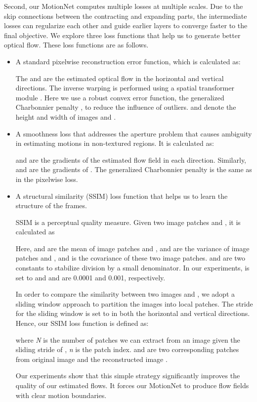 \documentclass[runningheads]{llncs}
\begin{document}
		Second, our MotionNet computes multiple losses at multiple scales. Due to the skip connections between the contracting and expanding parts, the intermediate losses can regularize each other and guide earlier layers to converge faster to the final objective. We explore three loss functions that help us to generate better optical flow. These loss functions are as follows. 
		\begin{itemize}
			\item A standard pixelwise reconstruction error function, which is calculated as:
			
			The  and  are the estimated optical flow in the horizontal and vertical directions. The inverse warping  is performed using a spatial transformer module \cite{stn_nips15}. Here we use a robust convex error function, the generalized Charbonnier penalty ,  to reduce the influence of outliers. {\color{black}  and  denote the height and width of images  and .}
			
			\item A smoothness loss that addresses the aperture problem that causes ambiguity in estimating motions in non-textured regions. It is calculated as:
			
			 and  are the gradients of the estimated flow field  in each direction. Similarly,   and  are the gradients of . The generalized Charbonnier penalty  is the same as in the pixelwise loss. 
			
			\item A structural similarity (SSIM) loss function{\color{black}\cite{SSIM_2004}} that helps us to learn the structure of the frames. {\color{black} SSIM is a perceptual quality measure. Given two  image patches  and , it is calculated as 
				
				Here,  and  are the mean of image patches  and ,  and  are the variance of image patches  and , and  is the covariance of these two image patches.  and  are two constants to stabilize division by a small denominator. In our experiments,  is set to  and  and  are 0.0001 and 0.001, respectively. 
				
				In order to compare the similarity between two images  and , we adopt a sliding window approach to partition the images into local patches. The stride for the sliding window is set to  in both the horizontal and vertical directions. Hence, our SSIM loss function is defined as: 
				
				
				where \textit{N} is the number of patches we can extract from an image given the sliding stride of , \textit{n} is the patch index.  and  are two corresponding patches from original image  and the reconstructed image .}  
			Our experiments show that this simple strategy significantly improves the quality of our estimated flows. It forces our MotionNet to produce flow fields with clear motion boundaries.
		\end{itemize}
		
\end{document}
